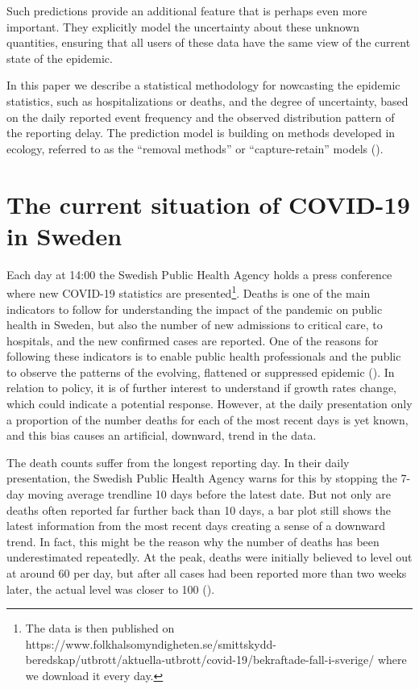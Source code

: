 \documentclass[a4paper,11pt,article,oneside,openany,american]{memoir}
\begin{document}
Such predictions provide an additional feature that is perhaps even more important. They explicitly model the uncertainty about these unknown quantities, ensuring that all users of these data have the same view of the current state of the epidemic.

In this paper we describe a statistical methodology for nowcasting the epidemic statistics, such as hospitalizations or deaths, and the degree of uncertainty, based on the daily reported event frequency and the observed distribution pattern of the reporting delay. The prediction model is building on methods developed in ecology, referred to as the “removal methods” or “capture-retain” models (\cite{Pollock1991_review_papers}).

\section{The current situation of COVID-19 in Sweden}
Each day at 14:00 the Swedish Public Health Agency holds a press conference where new COVID-19 statistics are presented\footnote{The data is then published on https://www.folkhalsomyndigheten.se/smittskydd-beredskap/utbrott/aktuella-utbrott/covid-19/bekraftade-fall-i-sverige/ where we download it every day.}. Deaths is one of the main indicators to follow for understanding the impact of the pandemic on public health in Sweden, but also the number of new admissions to critical care, to hospitals, and the new confirmed cases are reported. One of the reasons for following these indicators is to enable public health professionals and the public to observe the patterns of the evolving, flattened or suppressed epidemic (\cite{Anderson2020_how_will}). In relation to policy, it is of further interest to understand if growth rates change, which could indicate a potential response. However, at the daily presentation only a proportion of the number deaths for each of the most recent days is yet known, and this bias causes an artificial, downward, trend in the data.

The death counts suffer from the longest reporting day. In their daily presentation, the Swedish Public Health Agency warns for this by stopping the 7-day moving average trendline 10 days before the latest date. But not only are deaths often reported far further back than 10 days, a bar plot still shows the latest information from the most recent days creating a sense of a downward trend. In fact, this might be the reason why the number of deaths has been underestimated repeatedly. At the peak, deaths were initially believed to level out at around 60 per day, but after all cases had been reported more than two weeks later, the actual level was closer to 100 (\cite{Ohman2020_antalet_virusdoda}).
\end{document}
